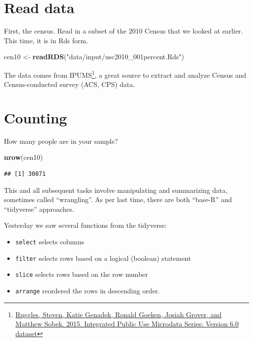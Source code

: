 \documentclass[]{book}
\newenvironment{Shaded}{\begin{snugshade}}{\end{snugshade}}
\newcommand{\KeywordTok}[1]{\textcolor[rgb]{0.13,0.29,0.53}{\textbf{#1}}}
\newcommand{\StringTok}[1]{\textcolor[rgb]{0.31,0.60,0.02}{#1}}
\newcommand{\NormalTok}[1]{#1}
\providecommand{\tightlist}{%
  \setlength{\itemsep}{0pt}\setlength{\parskip}{0pt}}
\let\rmarkdownfootnote\footnote%
\def\footnote{\protect\rmarkdownfootnote}
\theoremstyle{definition}
\theoremstyle{definition}
\theoremstyle{definition}
\theoremstyle{remark}
\begin{document}
\section{Read data}\label{read-data-2}

First, the census. Read in a subset of the 2010 Census that we looked at
earlier. This time, it is in Rds form.

\begin{Shaded}
\begin{Highlighting}[]
\NormalTok{cen10 <-}\StringTok{ }\KeywordTok{readRDS}\NormalTok{(}\StringTok{"data/input/usc2010_001percent.Rds"}\NormalTok{)}
\end{Highlighting}
\end{Shaded}

The data comes from IPUMS\footnote{\href{http://doi.org/10.18128/D010.V6.0}{Ruggles,
  Steven, Katie Genadek, Ronald Goeken, Josiah Grover, and Matthew
  Sobek. 2015. Integrated Public Use Microdata Series: Version 6.0
  dataset}}, a great source to extract and analyze Census and
Census-conducted survey (ACS, CPS) data.

\section{Counting}\label{counting}

How many people are in your sample?

\begin{Shaded}
\begin{Highlighting}[]
\KeywordTok{nrow}\NormalTok{(cen10)}
\end{Highlighting}
\end{Shaded}

\begin{verbatim}
## [1] 30871
\end{verbatim}

This and all subsequent tasks involve manipulating and summarizing data,
sometimes called ``wrangling''. As per last time, there are both
``base-R'' and ``tidyverse'' approaches.

Yesterday we saw several functions from the tidyverse:

\begin{itemize}
\tightlist
\item
  \texttt{select} selects columns
\item
  \texttt{filter} selects rows based on a logical (boolean) statement
\item
  \texttt{slice} selects rows based on the row number
\item
  \texttt{arrange} reordered the rows in descending order.
\end{itemize}
\end{document}
